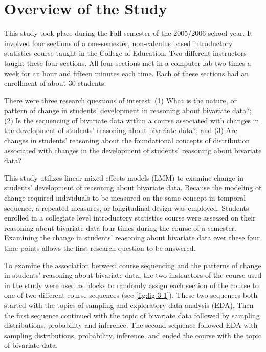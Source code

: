 \documentclass[11pt]{umnthesis}
\begin{document}
\hypertarget{overview-of-the-study}{%
\section{Overview of the Study}\label{overview-of-the-study}}

This study took place during the Fall semester of the 2005/2006 school year. It involved four sections of a one-semester, non-calculus based introductory statistics course taught in the College of Education. Two different instructors taught these four sections. All four sections met in a computer lab two times a week for an hour and fifteen minutes each time. Each of these sections had an enrollment of about 30 students.

There were three research questions of interest: (1) What is the nature, or pattern of change in students' development in reasoning about bivariate data?; (2) Is the sequencing of bivariate data within a course associated with changes in the development of students' reasoning about bivariate data?; and (3) Are changes in students' reasoning about the foundational concepts of distribution associated with changes in the development of students' reasoning about bivariate data?

This study utilizes linear mixed-effects models (LMM) to examine change in students' development of reasoning about bivariate data. Because the modeling of change required individuals to be measured on the same concept in temporal sequence, a repeated-measures, or longitudinal design was employed. Students enrolled in a collegiate level introductory statistics course were assessed on their reasoning about bivariate data four times during the course of a semester. Examining the change in students' reasoning about bivariate data over these four time points allows the first research question to be answered.

To examine the association between course sequencing and the patterns of change in students' reasoning about bivariate data, the two instructors of the course used in the study were used as blocks to randomly assign each section of the course to one of two different course sequences (see \ref{fig:fig-3-1}). These two sequences both started with the topics of sampling and exploratory data analysis (EDA). Then the first sequence continued with the topic of bivariate data followed by sampling distributions, probability and inference. The second sequence followed EDA with sampling distributions, probability, inference, and ended the course with the topic of bivariate data.
\end{document}
